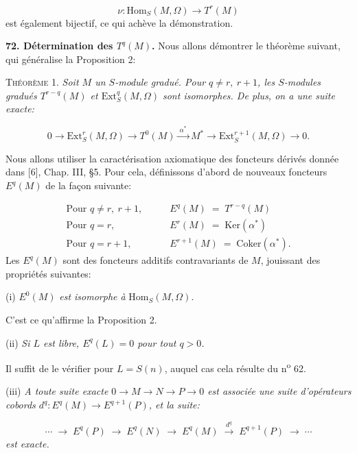 \begin{equation*}
\nu\colon \mathrm{Hom}_S(M, \Omega) \to T^r(M)
\end{equation*}
est également bijectif, ce qui achève la démonstration.

\textbf{72. Détermination des $T^q(M)$.} Nous allons démontrer le théorème suivant, qui généralise la Proposition 2:

\textsc{Théorème} 1. \textit{Soit $M$ un $S$-module gradué. Pour $q \neq r,\ r+1$, les $S$-modules gradués $T^{r-q}(M)$ et $\mathrm{Ext}_S^q(M, \Omega)$ sont isomorphes. De plus, on a une suite exacte:}

\begin{equation*}
0 \to \mathrm{Ext}_S^r(M, \Omega) \to T^0(M) \xrightarrow{\ \alpha^*\ } M^* \to \mathrm{Ext}_S^{r+1}(M, \Omega) \to 0.
\end{equation*}


Nous allons utiliser la caractérisation axiomatique des foncteurs dérivés donnée dans [6], Chap. III, §5. Pour cela, définissons d'abord de nouveaux foncteurs $E^q(M)$ de la façon suivante:

\begin{equation*}
\begin{array}{ll}
\text{Pour } q \neq r,\ r + 1, \qquad & E^q(M) \;=\; T^{r-q}(M) \\[4pt]
\text{Pour } q = r, \qquad & E^r(M) \;=\; \mathrm{Ker}(\alpha^*) \\[4pt]
\text{Pour } q = r + 1, \qquad & E^{r+1}(M) \;=\; \mathrm{Coker}(\alpha^*).
\end{array}
\end{equation*}
Les $E^q(M)$ sont des foncteurs additifs contravariants de $M$, jouissant des propriétés suivantes:

(i) $E^0(M)$ \textit{est isomorphe à} $\mathrm{Hom}_S(M, \Omega)$.

C'est ce qu'affirme la Proposition 2.

(ii) \textit{Si $L$ est libre, $E^q(L) = 0$ pour tout $q > 0$.}

Il suffit de le vérifier pour $L = S(n)$, auquel cas cela résulte du n\textsuperscript{o} 62.

(iii) \textit{A toute suite exacte $0 \to M \to N \to P \to 0$ est associée une suite d'opérateurs cobords $d^q\colon E^q(M) \to E^{q+1}(P)$, et la suite:}

\begin{equation*}
\cdots \;\to\; E^q(P) \;\to\; E^q(N) \;\to\; E^q(M) \;\xrightarrow{\ d^q\ }\; E^{q+1}(P) \;\to\; \cdots
\end{equation*}
\textit{est exacte.}

